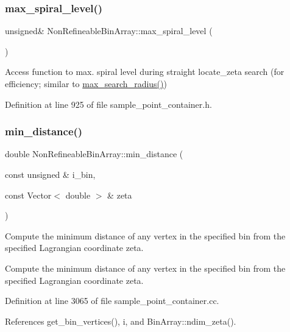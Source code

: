 \subsubsection{\texorpdfstring{max\+\_\+spiral\+\_\+level()}{max\_spiral\_level()}}
{\footnotesize\ttfamily unsigned\& Non\+Refineable\+Bin\+Array\+::max\+\_\+spiral\+\_\+level (\begin{DoxyParamCaption}{ }\end{DoxyParamCaption})\hspace{0.3cm}{\ttfamily [inline]}}



Access function to max. spiral level during straight locate\+\_\+zeta search (for efficiency; similar to \hyperlink{classSamplePointContainer_ad38b50923288cd35ff5e24ada05d0c59}{max\+\_\+search\+\_\+radius()}) 



Definition at line 925 of file sample\+\_\+point\+\_\+container.\+h.

\mbox{\label{classNonRefineableBinArray_aeec23360643e8a4581d8d841a97f2f2b}} 
\subsubsection{\texorpdfstring{min\+\_\+distance()}{min\_distance()}}
{\footnotesize\ttfamily double Non\+Refineable\+Bin\+Array\+::min\+\_\+distance (\begin{DoxyParamCaption}\item[{const unsigned \&}]{i\+\_\+bin,  }\item[{const Vector$<$ double $>$ \&}]{zeta }\end{DoxyParamCaption})}



Compute the minimum distance of any vertex in the specified bin from the specified Lagrangian coordinate zeta. 

Compute the minimum distance of any vertex in the specified bin from the specified Lagrangian coordinate zeta. 

Definition at line 3065 of file sample\+\_\+point\+\_\+container.\+cc.



References get\+\_\+bin\+\_\+vertices(), i, and Bin\+Array\+::ndim\+\_\+zeta().



